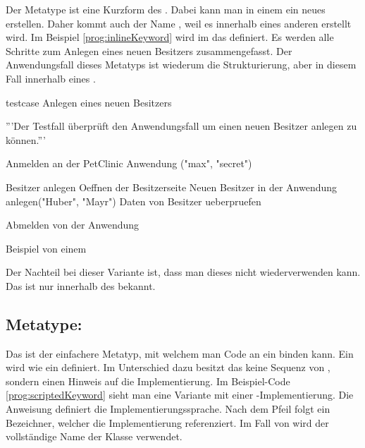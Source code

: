 Der Metatype  ist eine Kurzform des . Dabei kann man in einem  ein neues  erstellen. Daher kommt auch der Name , weil es innerhalb eines anderen  erstellt wird. Im Beispiel \ref{prog:inlineKeyword} wird im   das   definiert. Es werden alle Schritte zum Anlegen eines neuen Besitzers zusammengefasst. Der Anwendungsfall dieses Metatyps ist wiederum die Strukturierung, aber in diesem Fall innerhalb eines . 

\begin{program}
\begin{JavaCode}
testcase Anlegen eines neuen Besitzers {
	'''Der Testfall überprüft den Anwendungsfall um einen 
	   neuen Besitzer anlegen zu können.'''
	
	Anmelden an der PetClinic Anwendung ("max", "secret")
	
	Besitzer anlegen {
		Oeffnen der Besitzerseite		
		Neuen Besitzer in der Anwendung anlegen("Huber", "Mayr")
		Daten von Besitzer ueberpruefen
	}
	
	Abmelden von der Anwendung
}
\end{JavaCode}
\caption{Beispiel von einem }
\label{prog:inlineKeyword}
\end{program}

\SuperPar
Der Nachteil bei dieser Variante ist, dass man dieses  nicht wiederverwenden kann. Das  ist nur innerhalb des  bekannt.


\subsection{Metatype: }

Das  ist der einfachere Metatyp, mit welchem man Code an ein  binden kann. Ein  wird wie ein  definiert. Im Unterschied dazu besitzt das  keine Sequenz von , sondern einen Hinweis auf die Implementierung. Im Beispiel-Code \ref{prog:scriptedKeyword} sieht man eine Variante mit einer -Implementierung. Die Anweisung  definiert die Implementierungssprache. Nach dem Pfeil folgt ein Bezeichner, welcher die Implementierung referenziert. Im Fall von  wird der vollständige Name der Klasse verwendet.

